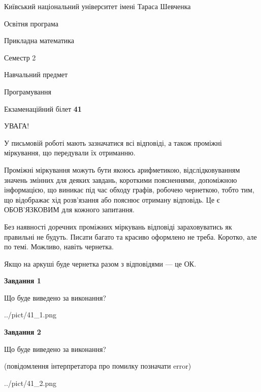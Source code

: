 \documentclass[12pt, ukrainian]{article}
\begin{document}
{{\begin {small}\par
{ \center  Київський національний університет імені Тараса Шевченка \par}
{\parbox {5 cm}{Освітня програма \hfill}{\parbox {7 cm}{Прикладна математика\hfill}}\parbox {6 cm}{\hfill Семестр 2}}\par
{\parbox {5 cm} {Навчальний предмет \hfill}\parbox {7 cm}{Програмування \hfill}\parbox {6cm}{\hfill}\par}\vspace{-7pt} \end{small}}{\center Екзаменаційний білет \No \textbf
{ 41 }\par}}
{
\begin {large}
УВАГА!

У письмовій роботі мають зазначатися всі відповіді, а також проміжні міркування, що передували їх отриманню.

Проміжні міркування можуть бути якоюсь арифметикою, відслідковуванням зна\-чень змінних для деяких завдань,
короткими поясненнями, допоміжною інформацією, що виникає під час обходу графів, робочею чернеткою,
тобто тим, що відображає хід розв’язання або пояснює отриману відповідь.
Це є ОБОВ’ЯЗКОВИМ для кожного запитання.

Без наявності доречних проміжних міркувань відповіді зараховуватись як правиль\-ні не будуть.
Писати багато та красиво оформлено не треба. Коротко, але по темі. Можли\-во, навіть чернетка.

Якщо на аркуші буде чернетка разом з відповідями --- це ОК.

\newpage

{\begin {center}\textbf{Завдання 1}\end {center}}\par
Що буде виведено за виконання?\par
\begin{center}
	{../pict/41_1.png}
\end{center}
\newpage

{\begin {center}\textbf{Завдання 2}\end {center}}\par
Що буде виведено за виконання?\par
 (повідомлення інтерпретатора про помилку позначати error)\par
\begin{center}
	{../pict/41_2.png}
\end{center}
\newpage


\end{large}}
\end{document}
